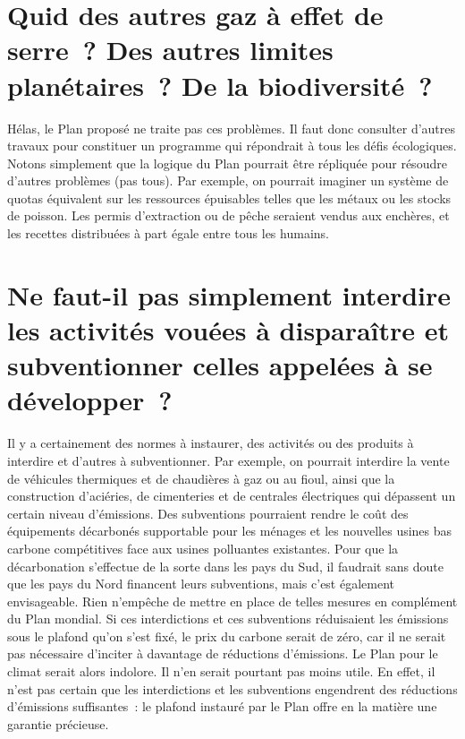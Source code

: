 \documentclass[a5paper,french]{memoir}
\begin{document}
\section*{\normalsize Quid des autres gaz à effet de serre~? Des autres limites planétaires~? De la biodiversité~?}\label{q:scope}

Hélas, le Plan proposé ne traite pas ces problèmes. Il faut donc consulter d'autres travaux pour constituer un programme qui répondrait à tous les défis écologiques. %
Notons simplement que la logique du Plan pourrait être répliquée pour résoudre d'autres problèmes (pas tous). Par exemple, on pourrait imaginer un système de quotas équivalent sur les ressources épuisables telles que les métaux ou les stocks de poisson. Les permis d'extraction ou de pêche seraient vendus aux enchères, et les recettes distribuées à part égale entre tous les humains.

\section*{\normalsize Ne faut-il pas simplement %
interdire les activités vouées à disparaître et subventionner celles appelées à se développer~?}\label{q:interdiction}

Il y a certainement des normes à instaurer, des activités ou des produits à interdire et d'autres à subventionner. Par exemple, on pourrait interdire la vente de véhicules thermiques et de chaudières à gaz ou au fioul, ainsi que la construction d'aciéries, de cimenteries et de centrales électriques qui dépassent un certain niveau d'émissions. Des subventions pourraient rendre le coût des équipements décarbonés supportable pour les ménages et les nouvelles usines bas carbone compétitives face aux usines polluantes existantes. Pour que la décarbonation s'effectue de la sorte dans les pays du Sud, il faudrait sans doute que les pays du Nord financent leurs subventions, mais c'est également envisageable. Rien n'empêche de mettre en place de telles mesures en complément du Plan mondial. Si ces interdictions et ces subventions réduisaient les émissions sous le plafond qu'on s'est fixé, le prix du carbone serait de zéro, car il ne serait pas nécessaire d'inciter à davantage de réductions d'émissions. Le Plan pour le climat serait alors indolore. Il n'en serait pourtant pas moins utile. En effet, il n'est pas certain que les interdictions et les subventions engendrent des réductions d'émissions suffisantes~: le plafond instauré par le Plan offre en la matière une garantie précieuse.
\end{document}
